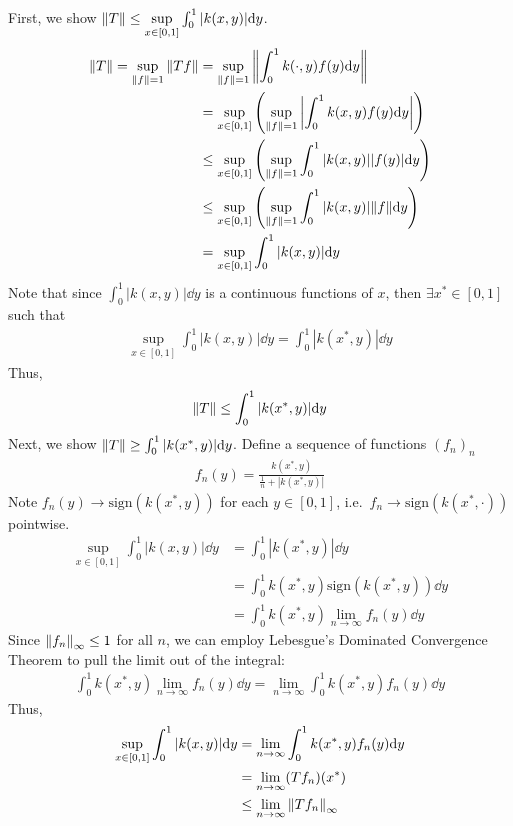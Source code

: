 \documentclass[12pt]{article}
\theoremstyle{plain}
\begin{document}
First, we show $\norm{T} \leq \sup\limits_{x\in[0,1]}\int_0^1|k(x,y)|\dd y$.
\begin{align*}
    \norm{T} = \sup\limits_{\norm{f}=1}\norm{Tf} &= \sup\limits_{\norm{f}=1}\norm{\int_0^1 k(\cdot,y)f(y)\dd y} \\
    &= \sup\limits_{x\in[0,1]}\qty(\sup\limits_{\norm{f}=1}\left|\int_0^1 k(x,y) f(y) \dd y\right|) \\
    &\leq \sup_{x\in[0,1]}\qty(\sup_{\norm{f}=1}\int_0^1|k(x,y)||f(y)|\dd y) \\
    &\leq \sup_{x\in[0,1]}\qty(\sup_{\norm{f}=1}\int_0^1|k(x,y)|\norm{f}\dd y) \\
    &= \sup_{x\in[0,1]}\int_0^1|k(x,y)|\dd y
\end{align*}
Note that since $\int_0^1|k(x,y)|\dd y$ is a continuous functions of $x$, then $\exists x^* \in [0,1]$ such that
\begin{align*}
    \sup\limits_{x\in[0,1]}\int_0^1|k(x,y)|\dd y = \int_0^1|k(x^*,y)|\dd y
\end{align*}
Thus,
\begin{align*}
    \norm{T} \leq \int_0^1|k(x^*,y)|\dd y
\end{align*}
Next, we show $\norm{T} \geq \int_0^1|k(x^*,y)|\dd y$.  Define a sequence of functions $(f_n)_n$
\begin{align*}
    f_n(y) = \frac{k(x^*,y)}{\frac{1}{n} + |k(x^*,y)|}
\end{align*}
Note $f_n(y) \rightarrow \text{sign}(k(x^*,y))$ for each $y \in [0,1]$, i.e.~$f_n \rightarrow \text{sign}(k(x^*,\cdot))$ pointwise.
\begin{align*}
    \sup_{x\in[0,1]}\int_0^1 |k(x,y)| \dd y &= \int_0^1 |k(x^*, y)| \dd y \\
    &= \int_0^1 k(x^*,y)\text{sign}(k(x^*,y)) \dd y \\
    &= \int_0^1 k(x^*,y)\lim\limits_{n\rightarrow\infty}f_n(y) \dd y
\end{align*}
Since $\norm{f_n}_\infty \leq 1$ for all $n$, we can employ Lebesgue's Dominated Convergence Theorem to pull the limit out of the integral:
\begin{align*}
    \int_0^1 k(x^*,y)\lim\limits_{n\rightarrow\infty}f_n(y) \dd y = \lim\limits_{n\rightarrow\infty} \int_0^1 k(x^*,y)f_n(y) \dd y
\end{align*}
Thus,
\begin{align*}
    \sup_{x\in[0,1]}\int_0^1 |k(x,y)| \dd y &= \lim\limits_{n\rightarrow\infty} \int_0^1 k(x^*,y)f_n(y) \dd y \\
    &= \lim_{n\rightarrow\infty} (Tf_n)(x^*) \\
    &\leq \lim_{n\rightarrow\infty} \norm{Tf_n}_\infty
\end{align*}
\end{document}
